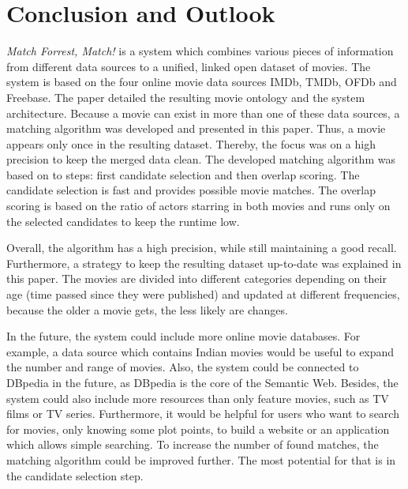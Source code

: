 \section{Conclusion and Outlook}
\label{sec_conclusion}

\emph{Match Forrest, Match!} is a system which combines various pieces of information from different data sources to a unified, linked open dataset of movies.
The system is based on the four online movie data sources IMDb, TMDb, OFDb and Freebase.
The paper detailed the resulting movie ontology and the system architecture.
Because a movie can exist in more than one of these data sources, a matching algorithm was developed and presented in this paper.
Thus, a movie appears only once in the resulting dataset.
Thereby, the focus was on a high precision to keep the merged data clean.
The developed matching algorithm was based on to steps: first candidate selection and then overlap scoring.
The candidate selection is fast and provides possible movie matches.
The overlap scoring is based on the ratio of actors starring in both movies and runs only on the selected candidates to keep the runtime low.

Overall, the algorithm has a high precision, while still maintaining a good recall.
Furthermore, a strategy to keep the resulting dataset up-to-date was explained in this paper.
The movies are divided into different categories depending on their age (time passed since they were published) and updated at different frequencies, because the older a movie gets, the less likely are changes.

In the future, the system could include more online movie databases.
For example, a data source which contains Indian movies would be useful to expand the number and range of movies.
Also, the system could be connected to DBpedia in the future, as DBpedia is the core of the Semantic Web.
Besides, the system could also include more resources than only feature movies, such as TV films or TV series.
Furthermore, it would be helpful for users who want to search for movies, only knowing some plot points, to build a website or an application which allows simple searching.
To increase the number of found matches, the matching algorithm could be improved further.
The most potential for that is in the candidate selection step.
